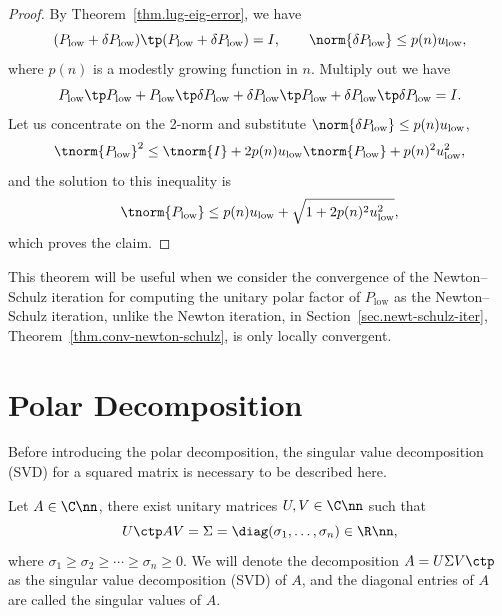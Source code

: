 \documentclass{article}
\numberwithin{equation}{section} %
\begin{document}
\begin{proof}
By Theorem~\ref{thm.lug-eig-error}, we have
\begin{equation}\notag
  (P_{\mathrm{low}} + \delta P_{\mathrm{low}}) \tp
  (P_{\mathrm{low}} + \delta P_{\mathrm{low}}) = I, \qquad
  \norm{\delta P_{\mathrm{low}}} \le p(n)u_{\mathrm{low}},
\end{equation}
where $p(n)$ is a modestly growing function in $n$.
Multiply out we have 
\begin{equation}\notag
  P_{\mathrm{low}}\tp P_{\mathrm{low}} + P_{\mathrm{low}}\tp
  \delta P_{\mathrm{low}} + \delta P_{\mathrm{low}} \tp 
  P_{\mathrm{low}} + \delta P_{\mathrm{low}} \tp \delta P_{\mathrm{low}}
  = I.
\end{equation}
Let us concentrate on the 2-norm and substitute $\norm{\delta P_{\mathrm{low}}}
\le p(n)u_{\mathrm{low}}$,
\begin{equation}\notag
  \tnorm{P_{\mathrm{low}}}^{2} \le \tnorm{I} + 2 p(n)u_{\mathrm{low}}
  \tnorm{P_{\mathrm{low}}} + p(n)^{2} 
  u_{\mathrm{low}}^{2},
\end{equation}
and the solution to this inequality is
\begin{equation}\label{eq.bound-on-normA}
  \tnorm{P_{\mathrm{low}}} \le 
  p(n)u_{\mathrm{low}} + \sqrt{1 + 2p(n)^{2}u_{\mathrm{low}}^{2}},
\end{equation}
which proves the claim.
\end{proof}

This theorem will be useful when we consider the convergence of the
Newton--Schulz iteration for computing the unitary polar factor of
$P_{\mathrm{low}}$ as the Newton--Schulz iteration, unlike the Newton iteration,
in Section~\ref{sec.newt-schulz-iter},
Theorem~\ref{thm.conv-newton-schulz}, is only locally convergent.

\section{Polar Decomposition}
Before introducing the polar decomposition, the singular value decomposition
(SVD) for a squared matrix is necessary to be described here.
\begin{theorem}
\label{thm.svd}
Let $A\in\C\nn$, there exist unitary matrices $U,V \in \C\nn$ such that
\begin{equation}\notag
  U\ctp A V = \Sigma = \diag(\sigma_{1},\dots,\sigma_{n}) \in \R\nn,
\end{equation}
where $\sigma_{1} \ge \sigma_{2} \ge \cdots \ge \sigma_{n} \ge 0$.
We will denote the decomposition $A = U\Sigma V\ctp$ as the singular value
decomposition (SVD) of $A$, and the diagonal entries of $A$ are called the
singular values of $A$.
\end{theorem}
\end{document}
